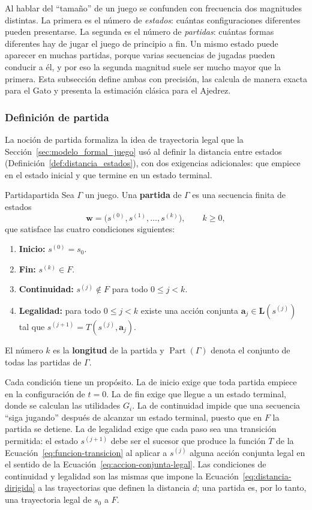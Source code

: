 Al hablar del ``tamaño'' de un juego se confunden con frecuencia dos magnitudes distintas. La primera es el número de \emph{estados}: cuántas configuraciones diferentes pueden presentarse. La segunda es el número de \emph{partidas}: cuántas formas diferentes hay de jugar el juego de principio a fin. Un mismo estado puede aparecer en muchas partidas, porque varias secuencias de jugadas pueden conducir a él, y por eso la segunda magnitud suele ser mucho mayor que la primera. Esta subsección define ambas con precisión, las calcula de manera exacta para el Gato y presenta la estimación clásica para el Ajedrez.

\subsubsection{Definición de partida}

La noción de partida formaliza la idea de trayectoria legal que la Sección~\ref{sec:modelo_formal_juego} usó al definir la distancia entre estados (Definición~\ref{def:distancia_estados}), con dos exigencias adicionales: que empiece en el estado inicial y que termine en un estado terminal.

\begin{definicion}{Partida}{partida}
Sea $\Gamma$ un juego. Una \textbf{partida} de $\Gamma$ es una secuencia finita de estados
\begin{equation}
    \mathbf w = \big(s^{(0)}, s^{(1)}, \dots, s^{(k)}\big), \qquad k \ge 0,
    \label{eq:an_partida}
\end{equation}
que satisface las cuatro condiciones siguientes:
\begin{enumerate}
    \item \textbf{Inicio:} $s^{(0)} = s_0$.
    \item \textbf{Fin:} $s^{(k)} \in F$.
    \item \textbf{Continuidad:} $s^{(j)} \notin F$ para todo $0 \le j < k$.
    \item \textbf{Legalidad:} para todo $0 \le j < k$ existe una acción conjunta $\mathbf a_j \in \mathbf L(s^{(j)})$ tal que $s^{(j+1)} = T(s^{(j)}, \mathbf a_j)$.
\end{enumerate}
El número $k$ es la \textbf{longitud} de la partida y $\operatorname{Part}(\Gamma)$ denota el conjunto de todas las partidas de $\Gamma$.
\end{definicion}

Cada condición tiene un propósito. La de inicio exige que toda partida empiece en la configuración de $t = 0$. La de fin exige que llegue a un estado terminal, donde se calculan las utilidades $G_i$. La de continuidad impide que una secuencia ``siga jugando'' después de alcanzar un estado terminal, puesto que en $F$ la partida se detiene. La de legalidad exige que cada paso sea una transición permitida: el estado $s^{(j+1)}$ debe ser el sucesor que produce la función $T$ de la Ecuación~\eqref{eq:funcion-transicion} al aplicar a $s^{(j)}$ alguna acción conjunta legal en el sentido de la Ecuación~\eqref{eq:accion-conjunta-legal}. Las condiciones de continuidad y legalidad son las mismas que impone la Ecuación~\eqref{eq:distancia-dirigida} a las trayectorias que definen la distancia $d$; una partida es, por lo tanto, una trayectoria legal de $s_0$ a $F$.


